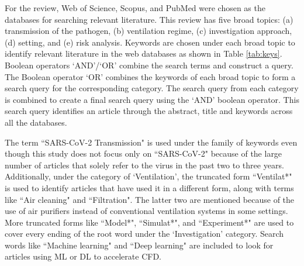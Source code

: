 \documentclass[a4paper,12pt]{elsarticle}
\begin{document}
For the review, Web of Science, Scopus, and PubMed were chosen as the databases for searching relevant literature. This review has five broad topics: (a) transmission of the pathogen, (b) ventilation regime, (c) investigation approach, (d) setting, and (e) risk analysis. Keywords are chosen under each broad topic to identify relevant literature in the web databases as shown in Table \ref{tab:keys}. Boolean operators `AND'/`OR' combine the search terms and construct a query. The Boolean operator `OR' combines the keywords of each broad topic to form a search query for the corresponding category. The search query from each category is combined to create a final search query using the `AND' boolean operator. This search query identifies an article through the abstract, title and keywords across all the databases.

The term ``SARS-CoV-2 Transmission" is used under the family of keywords even though this study does not focus only on ``SARS-CoV-2" because of the large number of articles that solely refer to the virus in the past two to three years. Additionally, under the category of `Ventilation', the truncated form ``Ventilat*" is used to identify articles that have used it in a different form, along with terms like ``Air cleaning" and ``Filtration". The latter two are mentioned because of the use of air purifiers instead of conventional ventilation systems in some settings. More truncated forms like ``Model*", ``Simulat*", and ``Experiment*" are used to cover every ending of the root word under the `Investigation' category. Search words like ``Machine learning" and ``Deep learning" are included to look for articles using ML or DL to accelerate CFD.
\end{document}
